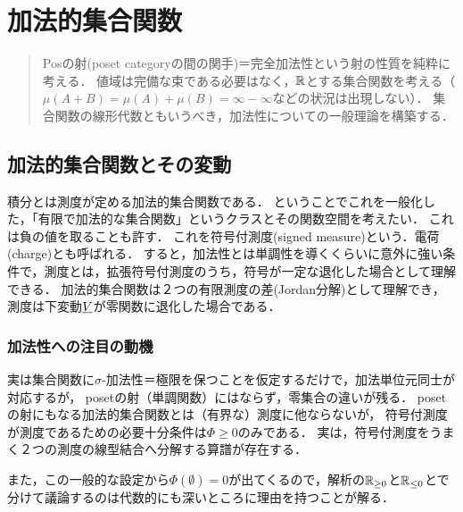 \documentclass[uplatex, dvipdfmx]{jsreport}
\begin{document}
\chapter{加法的集合関数}

\begin{quotation}
    Posの射(poset categoryの間の関手)＝完全加法性という射の性質を純粋に考える．
    値域は完備な束である必要はなく，$\mathbb{R}$とする集合関数を考える（$\mu(A+ B)=\mu(A)+\mu(B)=\infty-\infty$などの状況は出現しない）．
    集合関数の線形代数ともいうべき，加法性についての一般理論を構築する．
\end{quotation}

\section{加法的集合関数とその変動}

\begin{tcolorbox}[colframe=ForestGreen, colback=ForestGreen!10!white,breakable,colbacktitle=ForestGreen!40!white,coltitle=black,fonttitle=\bfseries\sffamily,
title=加法的集合関数という概念：表現可能関手！？]
    積分とは測度が定める加法的集合関数である．
    ということでこれを一般化した，「有限で加法的な集合関数」というクラスとその関数空間を考えたい．
    これは負の値を取ることも許す．
    これを符号付測度(signed measure)という．電荷(charge)とも呼ばれる．
    すると，加法性とは単調性を導くくらいに意外に強い条件で，測度とは，拡張符号付測度のうち，符号が一定な退化した場合として理解できる．
    加法的集合関数は２つの有限測度の差(Jordan分解)として理解でき，測度は下変動$\underline{V}$が零関数に退化した場合である．
\end{tcolorbox}

\subsection{加法性への注目の動機}

\begin{tcolorbox}[colframe=ForestGreen, colback=ForestGreen!10!white,breakable,colbacktitle=ForestGreen!40!white,coltitle=black,fonttitle=\bfseries\sffamily,
title=]
    実は集合関数に$\sigma$-加法性＝極限を保つことを仮定するだけで，加法単位元同士が対応するが，
    posetの射（単調関数）にはならず，零集合の違いが残る．
    posetの射にもなる加法的集合関数とは（有界な）測度に他ならないが，
    符号付測度が測度であるための必要十分条件は$\Phi\ge 0$のみである．
    実は，符号付測度をうまく２つの測度の線型結合へ分解する算譜が存在する．

    また，この一般的な設定から$\Phi(\emptyset)=0$が出てくるので，解析の$\mathbb{R}_{\ge 0}$と$\mathbb{R}_{\le 0}$とで分けて議論するのは代数的にも深いところに理由を持つことが解る．
\end{tcolorbox}
\end{document}
